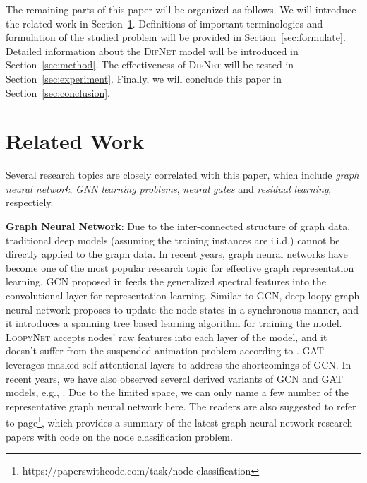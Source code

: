 \documentclass{article}
\newcommand{\our}{\textsc{DifNet}}
\newcommand{\loopy}{\textsc{LoopyNet}}
\newcommand{\gcn}{\textsc{GCN}}
\begin{document}
The remaining parts of this paper will be organized as follows. We will introduce the related work in Section~\ref{sec:related_work}. Definitions of important terminologies and formulation of the studied problem will be provided in Section~\ref{sec:formulate}. Detailed information about the {\our} model will be introduced in Section~\ref{sec:method}. The effectiveness of {\our} will be tested in Section~\ref{sec:experiment}. Finally, we will conclude this paper in Section~\ref{sec:conclusion}.






\section{Related Work}\label{sec:related_work}

Several research topics are closely correlated with this paper, which include \textit{graph neural network}, \textit{GNN learning problems}, \textit{neural gates} and \textit{residual learning}, respectiely.

\noindent \textbf{Graph Neural Network}: Due to the inter-connected structure of graph data, traditional deep models (assuming the training instances are i.i.d.) cannot be directly applied to the graph data. In recent years, graph neural networks \cite{MBMRSB16,AT16,MBBV15,Kipf_Semi_CORR_16,SGTHM09,ZCZYLS18,NAK16} have become one of the most popular research topic for effective graph representation learning. GCN proposed in \cite{Kipf_Semi_CORR_16} feeds the generalized spectral features into the convolutional layer for representation learning. Similar to {\gcn}, deep loopy graph neural network \cite{loopynet} proposes to update the node states in a synchronous manner, and it introduces a spanning tree based learning algorithm for training the model. {\loopy} accepts nodes' raw features into each layer of the model, and it doesn't suffer from the suspended animation problem according to \cite{Zhang_GResNet_19}. GAT \cite{Velickovic_Graph_ICLR_18} leverages masked self-attentional layers to address the shortcomings of GCN. In recent years, we have also observed several derived variants of GCN and GAT models, e.g., \cite{Klicpera_Personalized_18,Li_Combinatorial_18,Gao_GraphNAS_19}. Due to the limited space, we can only name a few number of the representative graph neural network here. The readers are also suggested to refer to page\footnote{https://paperswithcode.com/task/node-classification}, which provides a summary of the latest graph neural network research papers with code on the node classification problem. 
\end{document}
